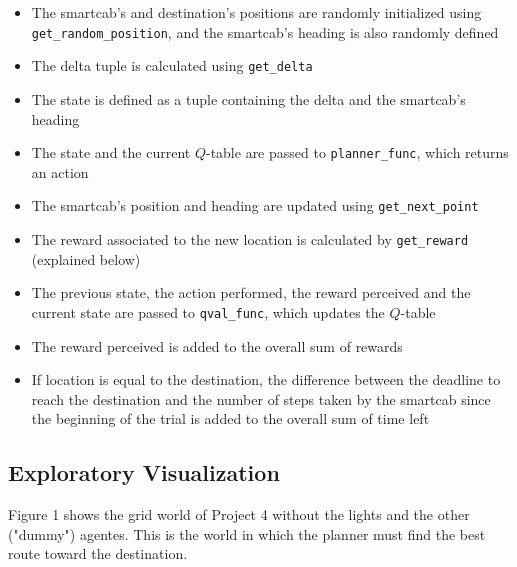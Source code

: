 \documentclass{article}
\begin{document}
\begin{enumerate}
\begin{itemize}
	\begin{itemize}
            \item The smartcab's and destination's positions are randomly initialized using \texttt{get\-\_random\-\_position}, and the smartcab's heading is also randomly defined
            \item The delta tuple is calculated using \texttt{get\_delta}
	    \item The state is defined as a tuple containing the delta and the smartcab's heading
	    \item The state and the current $Q$-table are passed to \texttt{planner\_func}, which returns an action
	    \item The smartcab's position and heading are updated using \texttt{get\_next\_point}
            \item The reward associated to the new location is calculated by \texttt{get\_reward} (explained below)
	    \item The previous state, the action performed, the reward perceived and the current state are passed to \texttt{qval\_func}, which updates the $Q$-table
	    \item The reward perceived is added to the overall sum of rewards
	    \item If location is equal to the destination, the difference between the deadline to reach the destination and the number of steps taken by the smartcab since the beginning of the trial is added to the overall sum of time left
	\end{itemize}
    \end{itemize}
\end{enumerate}

\subsection{Exploratory Visualization}
\label{sec:explovis}
Figure 1 shows the grid world of Project 4 without the lights and the other ("dummy") agentes. This is the world in which the planner must find the best route toward the destination.
\end{document}
